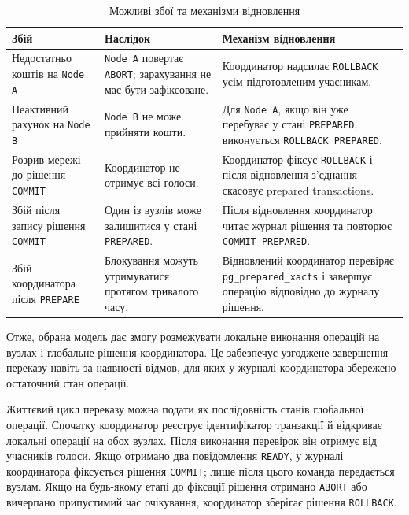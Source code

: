 \begin{table}[htbp]
\centering
\caption{Можливі збої та механізми відновлення}
\label{tab:failures}
\fontsize{11pt}{13pt}\selectfont
\setlength{\tabcolsep}{4pt}
\renewcommand{\arraystretch}{1.18}
\begin{tabularx}{\textwidth}{|>{\RaggedRight\arraybackslash}p{}|
                               >{\RaggedRight\arraybackslash}p{}|
                               Y|}
\hline
\textbf{Збій} & \textbf{Наслідок} & \textbf{Механізм відновлення} \\
\hline
Недостатньо коштів на \texttt{Node A} &
\texttt{Node A} повертає \texttt{ABORT}; зарахування не має бути зафіксоване. &
Координатор надсилає \texttt{ROLLBACK} усім підготовленим учасникам. \\
\hline
Неактивний рахунок на \texttt{Node B} &
\texttt{Node B} не може прийняти кошти. &
Для \texttt{Node A}, якщо він уже перебуває у стані \texttt{PREPARED}, виконується \texttt{ROLLBACK PREPARED}. \\
\hline
Розрив мережі до рішення \texttt{COMMIT} &
Координатор не отримує всі голоси. &
Координатор фіксує \texttt{ROLLBACK} і після відновлення з'єднання скасовує prepared transactions. \\
\hline
Збій після запису рішення \texttt{COMMIT} &
Один із вузлів може залишитися у стані \texttt{PREPARED}. &
Після відновлення координатор читає журнал рішення та повторює \texttt{COMMIT PREPARED}. \\
\hline
Збій координатора після \texttt{PREPARE} &
Блокування можуть утримуватися протягом тривалого часу. &
Відновлений координатор перевіряє \texttt{pg\_prepared\_xacts} і завершує операцію відповідно до журналу рішення. \\
\hline
\end{tabularx}
\end{table}

Отже, обрана модель дає змогу розмежувати локальне виконання операцій на вузлах і глобальне рішення координатора. Це забезпечує узгоджене завершення переказу навіть за наявності відмов, для яких у журналі координатора збережено остаточний стан операції.

Життєвий цикл переказу можна подати як послідовність станів глобальної операції. Спочатку координатор реєструє ідентифікатор транзакції й відкриває локальні операції на обох вузлах. Після виконання перевірок він отримує від учасників голоси. Якщо отримано два повідомлення \texttt{READY}, у журналі координатора фіксується рішення \texttt{COMMIT}; лише після цього команда передається вузлам. Якщо на будь-якому етапі до фіксації рішення отримано \texttt{ABORT} або вичерпано припустимий час очікування, координатор зберігає рішення \texttt{ROLLBACK}.

